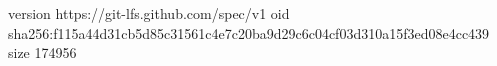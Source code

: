 version https://git-lfs.github.com/spec/v1
oid sha256:f115a44d31cb5d85c31561c4e7c20ba9d29c6c04cf03d310a15f3ed08e4cc439
size 174956
